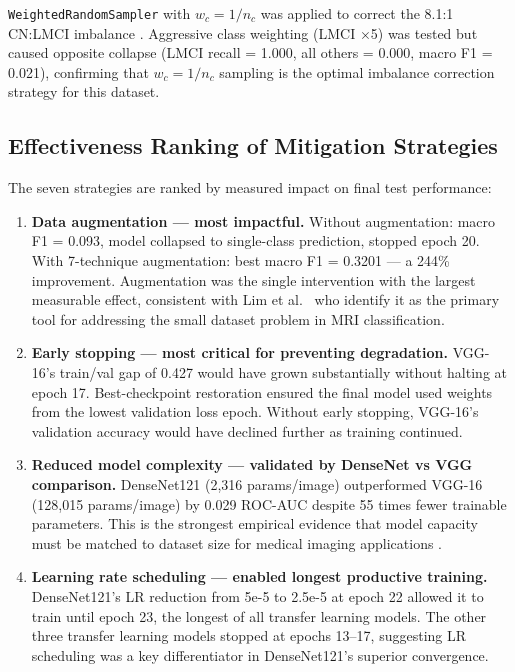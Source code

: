 \documentclass[12pt, a4paper]{article}
\begin{document}
\texttt{WeightedRandomSampler} with $w_c = 1/n_c$ was
applied to correct the 8.1:1 CN:LMCI imbalance
\cite{johnson2019}. Aggressive class weighting
(LMCI $\times$5) was tested but caused opposite collapse
(LMCI recall = 1.000, all others = 0.000, macro F1 = 0.021),
confirming that $w_c = 1/n_c$ sampling is the optimal
imbalance correction strategy for this dataset.

\subsection{Effectiveness Ranking of Mitigation Strategies}

The seven strategies are ranked by measured impact on
final test performance:

\begin{enumerate}
    \item \textbf{Data augmentation --- most impactful.}
    Without augmentation: macro F1 = 0.093, model collapsed
    to single-class prediction, stopped epoch 20. With
    7-technique augmentation: best macro F1 = 0.3201 ---
    a 244\% improvement. Augmentation was the single
    intervention with the largest measurable effect,
    consistent with Lim et al.\ \cite{lim2022} who
    identify it as the primary tool for addressing the
    small dataset problem in MRI classification.

    \item \textbf{Early stopping --- most critical for
    preventing degradation.} VGG-16's train/val gap of
    0.427 would have grown substantially without halting
    at epoch 17. Best-checkpoint restoration ensured the
    final model used weights from the lowest validation
    loss epoch. Without early stopping, VGG-16's
    validation accuracy would have declined further as
    training continued.

    \item \textbf{Reduced model complexity --- validated
    by DenseNet vs VGG comparison.} DenseNet121 (2,316
    params/image) outperformed VGG-16 (128,015
    params/image) by 0.029 ROC-AUC despite 55 times
    fewer trainable parameters. This is the strongest
    empirical evidence that model capacity must be
    matched to dataset size for medical imaging
    applications \cite{lim2022}.

    \item \textbf{Learning rate scheduling --- enabled
    longest productive training.} DenseNet121's LR
    reduction from 5e-5 to 2.5e-5 at epoch 22 allowed
    it to train until epoch 23, the longest of all
    transfer learning models. The other three transfer
    learning models stopped at epochs 13--17, suggesting
    LR scheduling was a key differentiator in
    DenseNet121's superior convergence.


\end{enumerate}
\end{document}
